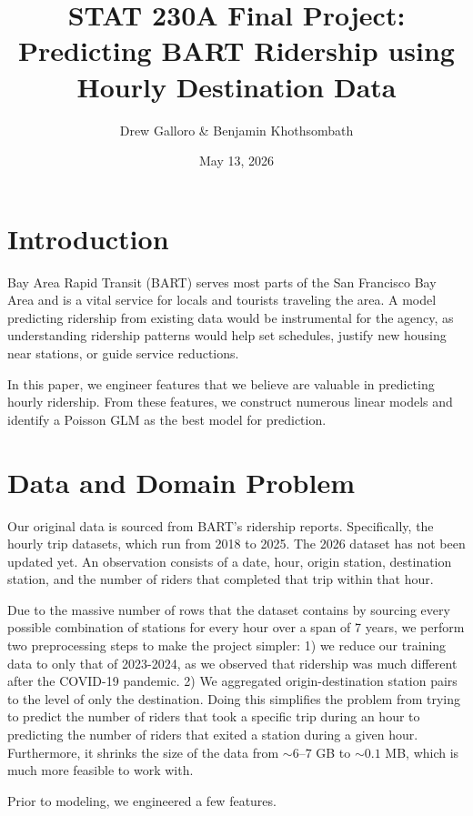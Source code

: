 \documentclass[11pt, letterpaper]{article}
\title{STAT 230A Final Project: Predicting BART Ridership using Hourly Destination Data}
\author{Drew Galloro \& Benjamin Khothsombath}
\date{May 13, 2026}
\begin{document}
\maketitle

\section{Introduction}
\label{sec:intro}

Bay Area Rapid Transit (BART) serves most parts of the San Francisco Bay Area and is a vital service for locals and tourists traveling the area. A model predicting ridership from existing data would be instrumental for the agency, as understanding ridership patterns would help set schedules, justify new housing near stations, or guide service reductions.

In this paper, we engineer features that we believe are valuable in predicting hourly ridership. From these features, we construct numerous linear models and identify a Poisson GLM as the best model for prediction.

\section{Data and Domain Problem}
\label{sec:data}

Our original data is sourced from BART's ridership reports. Specifically, the hourly trip datasets, which run from 2018 to 2025. The 2026 dataset has not been updated yet. An observation consists of a date, hour, origin station, destination station, and the number of riders that completed that trip within that hour.

Due to the massive number of rows that the dataset contains by sourcing every possible combination of stations for every hour over a span of 7 years, we perform two preprocessing steps to make the project simpler: 1) we reduce our training data to only that of 2023-2024, as we observed that ridership was much different after the COVID-19 pandemic. 2) We aggregated origin-destination station pairs to the level of only the destination. Doing this simplifies the problem from trying to predict the number of riders that took a specific trip during an hour to predicting the number of riders that exited a station during a given hour. Furthermore, it shrinks the size of the data from $\sim6$--$7$ GB to $\sim 0.1$ MB, which is much more feasible to work with.

Prior to modeling, we engineered a few features.
\end{document}
